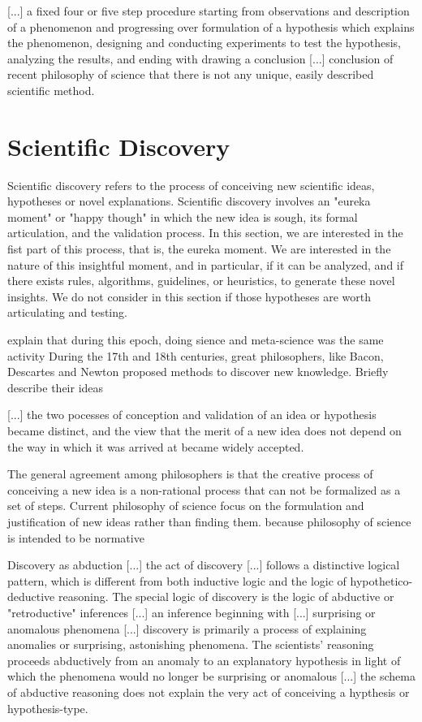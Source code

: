 {\color{red} [...] a fixed four or five step procedure starting from observations and description of a phenomenon and progressing over formulation of a hypothesis which explains the phenomenon, designing and conducting experiments to test the hypothesis, analyzing the results, and ending with drawing a conclusion [...] conclusion of recent philosophy of science that there is not any unique, easily described scientific method.}

\section{Scientific Discovery}

Scientific discovery refers to the process of conceiving new scientific ideas, hypotheses or novel explanations. Scientific discovery involves an "eureka moment" or "happy though" in which the new idea is sough, its formal articulation, and the validation process. In this section, we are interested in the fist part of this process, that is, the eureka moment. We are interested in the nature of this insightful moment, and in particular, if it can be analyzed, and if there exists rules, algorithms, guidelines, or heuristics, to generate these novel insights. We do not consider in this section if those hypotheses are worth articulating and testing.

{\color{red} explain that during this epoch, doing sience and meta-science was the same activity} During the 17th and 18th centuries, great philosophers, like Bacon, Descartes and Newton proposed methods to discover new knowledge. {\color{red} Briefly describe their ideas}

{\color{red} [...] the two pocesses of conception and validation of an idea or hypothesis became distinct, and the view that the merit of a new idea does not depend on the way in which it was arrived at became widely accepted.} 

The general agreement among philosophers is that the creative process of conceiving a new idea is a non-rational process that can not be formalized as a set of steps. Current philosophy of science focus on the formulation and justification of new ideas rather than finding them. {\color{red} because philosophy of science is intended to be normative}

{\color{red} Discovery as abduction [...] the act of discovery [...] follows a distinctive logical pattern, which is different from both inductive logic and the logic of hypothetico-deductive reasoning. The special logic of discovery is the logic of abductive or "retroductive" inferences [...] an inference beginning with [...] surprising or anomalous phenomena [...] discovery is primarily a process of explaining anomalies or surprising, astonishing phenomena. The scientists' reasoning proceeds abductively from an anomaly to an explanatory hypothesis in light of which the phenomena would no longer be surprising or anomalous [...] the schema of abductive reasoning does not explain the very act of conceiving a hypthesis or hypothesis-type.}

